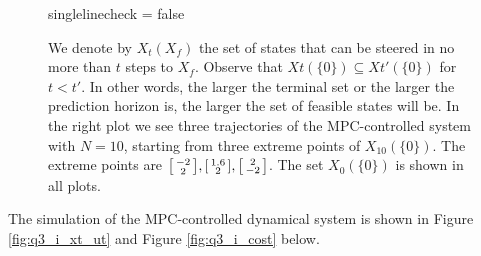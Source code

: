 \documentclass[a4paper,11pt,reqno]{amsart}
\begin{document}
\begin{figure}[H]
{              singlelinecheck = false}
    \caption{We denote by $X_t(X_f)$ the set of states that can be steered in no more than $t$
    steps to $X_f$. Observe that $Xt(\{0\})\subseteq Xt'(\{0\})$ for $t < t'$. In
    other words, the larger the terminal set or the larger the prediction horizon is, the larger
    the set of feasible states will be. In the right plot we see three trajectories of the
    MPC-controlled system with $N = 10$, starting from three extreme points of $X_{10}(\{0\})$. The extreme points are $\begin{bsmallmatrix}-2\\2\end{bsmallmatrix}, \begin{bsmallmatrix}1.6\\2\end{bsmallmatrix}, \begin{bsmallmatrix}2\\-2\end{bsmallmatrix}$. The set
    $X_0(\{0\})$ is shown in all plots.
    \label{fig:q3_i_Xx}}
\end{figure}
The simulation of the MPC-controlled dynamical system is shown in Figure \ref{fig:q3_i_xt_ut} and Figure \ref{fig:q3_i_cost} below.
\end{document}
